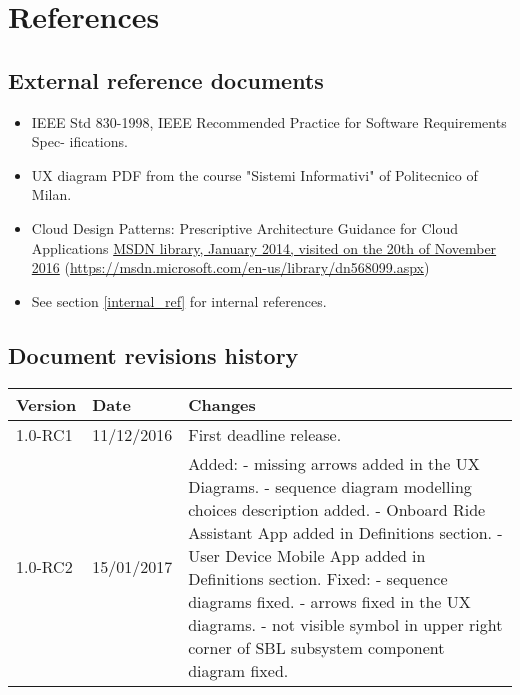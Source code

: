 \section{References}

\subsection{External reference documents}
\label{external_ref}
\begin{itemize}
    \item IEEE Std 830-1998, IEEE Recommended Practice for Software Requirements Spec- ifications.
    \item UX diagram PDF from the course "Sistemi Informativi" of Politecnico of Milan.
    \item Cloud Design Patterns: Prescriptive Architecture Guidance for Cloud Applications \href{https://msdn.microsoft.com/en-us/library/dn568099.aspx}{MSDN library, January 2014, visited on the 20th of November 2016} (\url{https://msdn.microsoft.com/en-us/library/dn568099.aspx})
    \item See section \ref{internal_ref} for internal references.
\end{itemize}



\subsection{Document revisions history}
\begin{tabular}{| l | l | p{10cm} |}
\hline
\textbf{Version} & \textbf{Date} & \textbf{Changes}\\
\hline
1.0-RC1 & 11/12/2016 & First deadline release.\\
\hline
1.0-RC2 & 15/01/2017 & Added:\newline
    - missing arrows added in the UX Diagrams.\newline
    - sequence diagram modelling choices description added.\newline
    - Onboard Ride Assistant App added in Definitions section.\newline
    - User Device Mobile App added in Definitions section.\newline
    Fixed:\newline
    - sequence diagrams fixed.\newline
    - arrows fixed in the UX diagrams.\newline
    - not visible symbol in upper right corner of SBL subsystem component diagram fixed.\\
\hline
\end{tabular} 